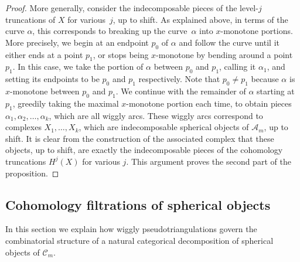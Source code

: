 \documentclass{amsart}
\theoremstyle{definition}
\begin{document}
\begin{proof}
  More generally, consider the indecomposable pieces of the level-\(j\) truncations of \(X\) for various~\(j\), up to shift.
  As explained above, in terms of the curve \(\alpha\), this corresponds to breaking up the curve~\(\alpha\) into \(x\)-monotone portions.
  More precisely, we begin at an endpoint \(p_0\) of \(\alpha\) and follow the curve until it either ends at a point \(p_1\), or stops being \(x\)-monotone by bending around a point \(p_1\).
  In this case, we take the portion of \(\alpha\) between \(p_0\) and \(p_1\), calling it \(\alpha_1\), and setting its endpoints to be \(p_0\) and \(p_1\) respectively.
  Note that \(p_0 \neq p_1\) because \(\alpha\) is \(x\)-monotone between \(p_0\) and \(p_1\).
  We continue with the remainder of \(\alpha\) starting at \(p_1\), greedily taking the maximal \(x\)-monotone portion each time, to obtain pieces \(\alpha_1,\alpha_2, \ldots, \alpha_k\), which are all wiggly arcs.
  These wiggly arcs correspond to complexes \(X_1, \ldots, X_k\), which are indecomposable spherical objects of \(\mathcal{A}_m\), up to shift.
  It is clear from the construction of the associated complex that these objects, up to shift, are exactly the indecomposable pieces of the cohomology truncations \(H^j(X)\) for various \(j\).
  This argument proves the second part of the proposition.
\end{proof}


\subsection{Cohomology filtrations of spherical objects}

In this section we explain how wiggly pseudotriangulations govern the combinatorial structure of a natural categorical decomposition of spherical objects of \(\mathcal{C}_m\).
\end{document}
